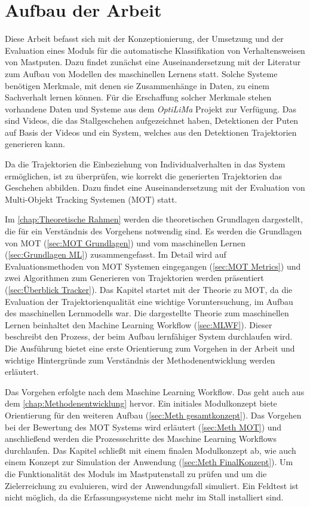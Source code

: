\section{Aufbau der Arbeit}
Diese Arbeit befasst sich mit der Konzeptionierung, der Umsetzung und der Evaluation eines Moduls für die automatische Klassifikation von Verhaltensweisen von Mastputen. Dazu findet zunächst eine Auseinandersetzung mit der Literatur zum Aufbau von Modellen des maschinellen Lernens statt. Solche Systeme benötigen Merkmale, mit denen sie Zusammenhänge in Daten, zu einem Sachverhalt lernen können. Für die Erschaffung solcher Merkmale stehen vorhandene Daten und Systeme aus dem \textit{\acrshort{OptiLiMa}} Projekt zur Verfügung. Das sind Videos, die das Stallgeschehen aufgezeichnet haben, Detektionen der Puten auf Basis der Videos und ein System, welches aus den Detektionen Trajektorien generieren kann.\par

Da die Trajektorien die Einbeziehung von Individualverhalten in das System ermöglichen, ist zu überprüfen, wie korrekt die generierten Trajektorien das Geschehen abbilden. Dazu  findet eine Auseinandersetzung mit der Evaluation von Multi-Objekt Tracking Systemen (MOT) statt.\par

Im \autoref{chap:Theoretische Rahmen} werden die theoretischen Grundlagen dargestellt, die für ein Verständnis des Vorgehens notwendig sind. Es werden die Grundlagen von MOT (\autoref{sec:MOT Grundlagen}) und vom maschinellen Lernen (\autoref{sec:Grundlagen ML}) zusammengefasst. Im Detail wird auf Evaluationsmethoden von MOT Systemen eingegangen (\autoref{sec:MOT Metrics}) und zwei Algorithmen zum Generieren von Trajektorien werden präsentiert (\autoref{sec:Überblick Tracker}). Das Kapitel startet mit der Theorie zu MOT, da die Evaluation der Trajektorienqualität eine wichtige Voruntersuchung, im Aufbau des maschinellen Lernmodells war. Die dargestellte Theorie zum maschinellen Lernen beinhaltet den Machine Learning Workflow (\autoref{sec:MLWF}). Dieser beschreibt den Prozess, der beim Aufbau lernfähiger System durchlaufen wird. Die Ausführung bietet eine erste Orientierung zum Vorgehen in der Arbeit und wichtige Hintergründe zum Verständnis der Methodenentwicklung werden erläutert. \par

Das Vorgehen erfolgte nach dem Maschine Learning Workflow. Das geht auch aus dem \autoref{chap:Methodenentwicklung} hervor. Ein initiales Modulkonzept biete Orientierung für den weiteren Aufbau (\autoref{sec:Meth gesamtkonzept}). Das Vorgehen bei der Bewertung des MOT Systems wird erläutert (\autoref{sec:Meth MOT}) und anschließend werden die Prozessschritte des Maschine Learning Workflows durchlaufen. Das Kapitel schließt mit einem finalen Modulkonzept ab, wie auch einem Konzept zur Simulation der Anwendung (\autoref{sec:Meth FinalKonzept}). Um die Funktionalität des Moduls im Mastputenstall zu prüfen und um die Zielerreichung zu evaluieren, wird der Anwendungsfall simuliert. Ein Feldtest ist nicht möglich, da die Erfassungssysteme nicht mehr im Stall installiert sind. \par

